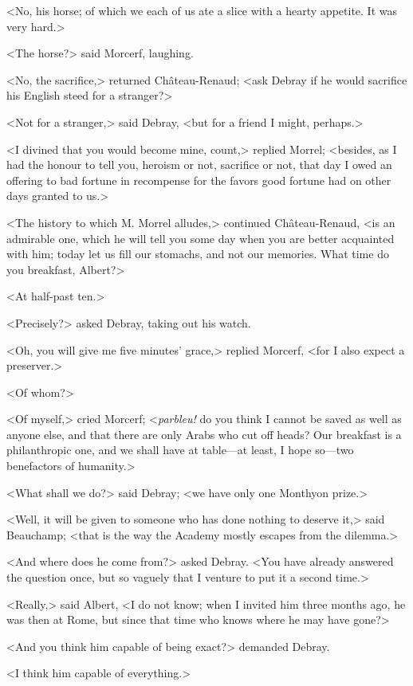  <No, his horse; of which we each of us ate a slice with a hearty appetite. It was very hard.> 

 <The horse?> said Morcerf, laughing. 

 <No, the sacrifice,> returned Château-Renaud; <ask Debray if he would sacrifice his English steed for a stranger?> 

 <Not for a stranger,> said Debray, <but for a friend I might, perhaps.> 

 <I divined that you would become mine, count,> replied Morrel; <besides, as I had the honour to tell you, heroism or not, sacrifice or not, that day I owed an offering to bad fortune in recompense for the favors good fortune had on other days granted to us.> 

 <The history to which M. Morrel alludes,> continued Château-Renaud, <is an admirable one, which he will tell you some day when you are better acquainted with him; today let us fill our stomachs, and not our memories. What time do you breakfast, Albert?> 

 <At half-past ten.> 

 <Precisely?> asked Debray, taking out his watch. 

 <Oh, you will give me five minutes' grace,> replied Morcerf, <for I also expect a preserver.> 

 <Of whom?> 

 <Of myself,> cried Morcerf; <\textit{parbleu!} do you think I cannot be saved as well as anyone else, and that there are only Arabs who cut off heads? Our breakfast is a philanthropic one, and we shall have at table—at least, I hope so—two benefactors of humanity.> 

 <What shall we do?> said Debray; <we have only one Monthyon prize.> 

 <Well, it will be given to someone who has done nothing to deserve it,> said Beauchamp; <that is the way the Academy mostly escapes from the dilemma.> 

 <And where does he come from?> asked Debray. <You have already answered the question once, but so vaguely that I venture to put it a second time.> 

 <Really,> said Albert, <I do not know; when I invited him three months ago, he was then at Rome, but since that time who knows where he may have gone?> 

 <And you think him capable of being exact?> demanded Debray. 

 <I think him capable of everything.> 

